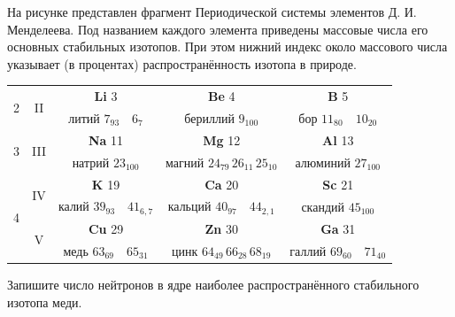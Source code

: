 \begin{taskbasic}[code={\label{task:nuclear_mendeleev_table_copper}}]
На рисунке представлен фрагмент Периодической системы элементов Д. И. Менделеева. Под названием каждого элемента приведены массовые числа его основных стабильных изотопов. При этом нижний индекс около массового числа указывает (в процентах) распространённость изотопа в природе.

\nopagebreak\smallskip
\begin{center}
\small
\begin{tabular}{|c|c||c|c|c|}
\hline
\multirow{2}{*}{2} & \multirow{2}{*}{II} & \textbf{Li} \hfill 3 & \textbf{Be} \hfill 4 & \textbf{B} \hfill 5 \\
 & & литий $7_{93} \quad 6_7$ & бериллий $9_{100}$ & бор $11_{80} \quad 10_{20}$ \\ \hline
\multirow{2}{*}{3} & \multirow{2}{*}{III} & \textbf{Na} \hfill 11 & \textbf{Mg} \hfill 12 & \textbf{Al} \hfill 13 \\
 & & натрий $23_{100}$ & магний $24_{79} \, 26_{11} \, 25_{10}$ & алюминий $27_{100}$ \\ \hline
\multirow{4}{*}{4} & \multirow{2}{*}{IV} & \textbf{K} \hfill 19 & \textbf{Ca} \hfill 20 & \textbf{Sc} \hfill 21 \\
 & & калий $39_{93} \quad 41_{6,7}$ & кальций $40_{97} \quad 44_{2,1}$ & скандий $45_{100}$ \\ \cline{2-5}
 & \multirow{2}{*}{V} & \textbf{Cu} \hfill 29 & \textbf{Zn} \hfill 30 & \textbf{Ga} \hfill 31 \\
 & & медь $63_{69} \quad 65_{31}$ & цинк $64_{49} \, 66_{28} \, 68_{19}$ & галлий $69_{60} \quad 71_{40}$ \\ \hline
\end{tabular}
\end{center}
\smallskip

Запишите число нейтронов в ядре наиболее распространённого стабильного изотопа меди.

\end{taskbasic}

